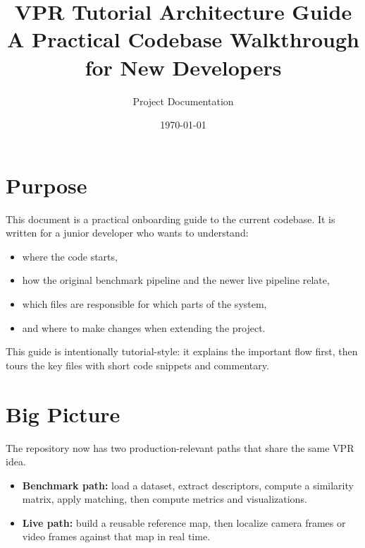 \documentclass[11pt]{article}
\title{\textbf{VPR Tutorial Architecture Guide}\\[4pt]
A Practical Codebase Walkthrough for New Developers}
\author{Project Documentation}
\date{\today}
\newcommand{\step}[1]{\textbf{#1}}
\begin{document}
\maketitle

\section*{Purpose}
This document is a practical onboarding guide to the current codebase. It is written for a junior developer who wants to understand:

\begin{itemize}[leftmargin=*]
  \item where the code starts,
  \item how the original benchmark pipeline and the newer live pipeline relate,
  \item which files are responsible for which parts of the system,
  \item and where to make changes when extending the project.
\end{itemize}

This guide is intentionally tutorial-style: it explains the important flow first, then tours the key files with short code snippets and commentary.

\section{Big Picture}
The repository now has two production-relevant paths that share the same VPR idea.

\begin{itemize}[leftmargin=*]
  \item \step{Benchmark path:} load a dataset, extract descriptors, compute a similarity matrix, apply matching, then compute metrics and visualizations.
  \item \step{Live path:} build a reusable reference map, then localize camera frames or video frames against that map in real time.
\end{itemize}
\end{document}
